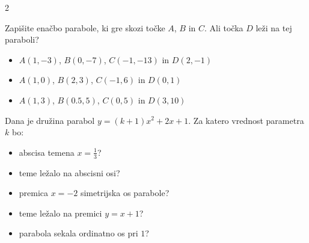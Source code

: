  

            \begin{multicols}{2}
                
    

            \begin{naloga}
                Zapišite enačbo parabole, ki gre skozi točke $A$, $B$ in $C$.
                Ali točka $D$ leži na tej paraboli?
                
                    \begin{itemize}
                        \item $A(1,-3)$, $B(0,-7)$, $C(-1,-13)$ in $D(2,-1)$ 
                        \item $A(1,0)$, $B(2,3)$, $C(-1,6)$ in $D(0,1)$ 
                        \item $A(1,3)$, $B(0.5,5)$, $C(0,5)$ in $D(3,10)$

                    \end{itemize}

            \end{naloga}


            \begin{naloga}
                Dana je družina parabol $y=\left(k+1\right)x^2+2x+1$. 
                Za katero vrednost parametra $k$ bo:
                
                    \begin{itemize}
                        \item abscisa temena $x=\frac{1}{3}$?
                        \item teme ležalo na abscisni osi?
                        \item premica $x=-2$ simetrijska os parabole?
                        \item teme ležalo na premici $y=x+1$?
                        \item parabola sekala ordinatno os pri $1$?
                    \end{itemize}

            \end{naloga}

            \end{multicols}



